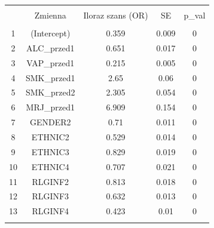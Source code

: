
\begin{tabular}{@{\extracolsep{5pt}} ccccc} 
\\[-1.8ex]\hline 
\hline \\[-1.8ex] 
 & Zmienna & Iloraz szans (OR) & SE & p\_val \\ 
\hline \\[-1.8ex] 
1 & (Intercept) & 0.359 & 0.009 & 0 \\ 
2 & ALC\_przed1 & 0.651 & 0.017 & 0 \\ 
3 & VAP\_przed1 & 0.215 & 0.005 & 0 \\ 
4 & SMK\_przed1 & 2.65 & 0.06 & 0 \\ 
5 & SMK\_przed2 & 2.305 & 0.054 & 0 \\ 
6 & MRJ\_przed1 & 6.909 & 0.154 & 0 \\ 
7 & GENDER2 & 0.71 & 0.011 & 0 \\ 
8 & ETHNIC2 & 0.529 & 0.014 & 0 \\ 
9 & ETHNIC3 & 0.829 & 0.019 & 0 \\ 
10 & ETHNIC4 & 0.707 & 0.021 & 0 \\ 
11 & RLGINF2 & 0.813 & 0.018 & 0 \\ 
12 & RLGINF3 & 0.632 & 0.013 & 0 \\ 
13 & RLGINF4 & 0.423 & 0.01 & 0 \\ 
\hline \\[-1.8ex] 
\end{tabular} 
